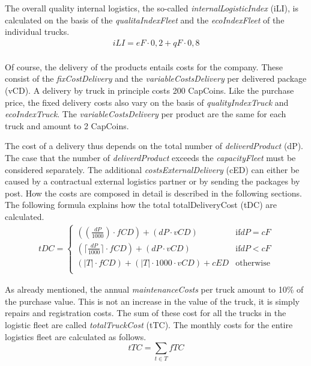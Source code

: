 The overall quality internal logistics, the so-called \textit{internalLogisticIndex} (\gls{iLI}), is calculated on the basis of the \textit{qualitaIndexFleet} and the \textit{ecoIndexFleet} of the individual trucks.
\begin{equation}
\label{func:internalLogisticIndex}
\begin{aligned}
    iLI = eF \cdot 0,2 + qF \cdot 0,8 \\
\end{aligned}
\end{equation}

Of course, the delivery of the products entails costs for the company. These consist of the \textit{fixCostDelivery} and the \textit{variableCostsDelivery} per delivered package (\gls{vCD}). 
A delivery by truck in principle costs 200 CapCoins. Like the purchase price, the fixed delivery costs also vary on the basis of \textit{qualityIndexTruck} and \textit{ecoIndexTruck}. The \textit{variableCostsDelivery} per product are the same for each truck and amount to 2 CapCoins.

The cost of a delivery thus depends on the total number of \textit{deliverdProduct} (\gls{dP}). 
The case that the number of \textit{deliverdProduct} exceeds the \textit{capacityFleet} must be considered separately. The additional \textit{costsExternalDelivery} (\gls{cED}) can either be caused by a contractual external logistics partner or by sending the packages by post. How the costs are composed in detail is described in the following sections. \\
The following formula explains how the total totalDeliveryCost (\gls{tDC}) are calculated. 
\begin{equation}
\label{func:deliveryCost}
\begin{aligned}
tDC = 
\begin{cases}
    (( \frac{dP}{1000} ) \cdot fCD) + ( dP \cdot vCD) & \text{if} dP = cF\\
    (\lceil \frac{dP}{1000} \rceil \cdot fCD ) + ( dP \cdot vCD) & \text{if} dP < cF\\
    ( |T| \cdot fCD ) + ( |T| \cdot1000 \cdot vCD ) + cED & \text{otherwise}\\
\end{cases}
\end{aligned}
\end{equation}

As already mentioned, the annual \textit{maintenanceCosts}  per truck amount to 10\% of the purchase value. This is not an increase in the value of the truck, it is simply repairs and registration costs. The sum of these cost for all the trucks in the logistic fleet are called \textit{totalTruckCost} (\gls{tTC}). The monthly costs for the entire logistics fleet are calculated as follows. 
\begin{equation}
    tTC = \sum_{t \in T} fTC
\end{equation}


